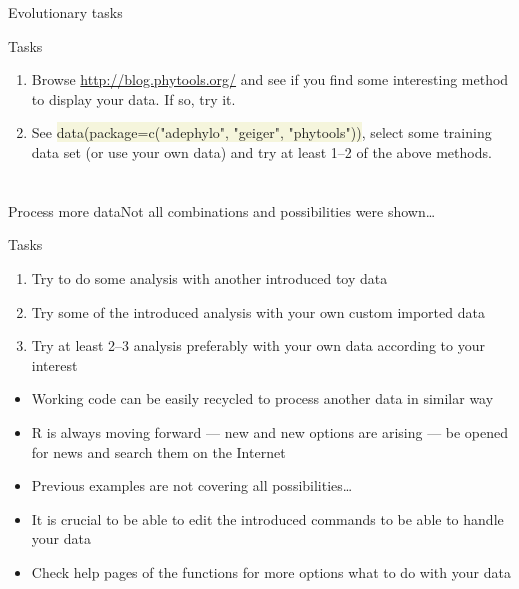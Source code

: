 \documentclass[compress, ucs, xelatex, 11pt, xcolor=svgnames, aspectratio=169,
	hyperref={
		bookmarks=true,
		unicode=true,
		colorlinks=true,
		pdftitle={Molecular data in R},
		plainpages=false,
		pdfauthor={Vojtech Zeisek},
		pdfsubject={Course about phylogeny and evolution in R},
		pdfcreator={XeLaTeX},
		pdfkeywords={R, evolution, phylogeny, molecular data},
		linkcolor=Crimson, %
		anchorcolor=Magenta, %
		citecolor=Magenta, %
		filecolor=Magenta, %
		menucolor=Magenta, %
		urlcolor=DodgerBlue, %
		pdftex},
	url={hyphens, lowtilde} %
	]{beamer}
\renewcommand{\texttt}[1]{\colorbox{Beige}{{\ttfamily #1}}}
\begin{document}
\begin{frame}{Evolutionary tasks}
	\begin{exampleblock}{Tasks}
		\begin{enumerate}
			\item Browse \url{http://blog.phytools.org/} and see if you find some interesting method to display your data. If so, try it.
			\item See \texttt{data(package=c("adephylo", "geiger", "phytools"))}, select some training data set (or use your own data) and try at least 1--2 of the above methods.
		\end{enumerate}
	\end{exampleblock}
\end{frame}

\section{}

\begin{frame}{Process more data}{Not all combinations and possibilities were shown\ldots}
	\begin{exampleblock}{Tasks}
		\begin{enumerate}
			\item Try to do some analysis with another introduced toy data
			\item Try some of the introduced analysis with your own custom imported data
			\item Try at least 2--3 analysis preferably with your own data according to your interest
		\end{enumerate}
	\end{exampleblock}
	\begin{itemize}
		\item Working code can be easily recycled to process another data in similar way
		\item R is always moving forward --- new and new options are arising --- be opened for news and search them on the Internet
		\item Previous examples are not covering all possibilities\ldots
		\item It is crucial to be able to edit the introduced commands to be able to handle your data
		\item Check help pages of the functions for more options what to do with your data
	\end{itemize}
\end{frame}
\end{document}
